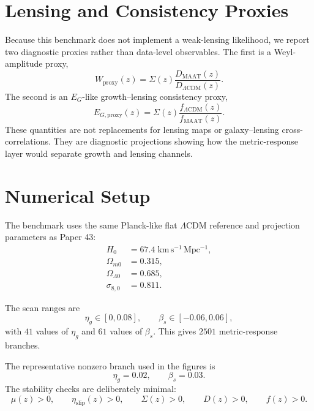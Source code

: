\documentclass[11pt,a4paper]{article}
\newcommand{\LCDM}{\Lambda\mathrm{CDM}}
\newcommand{\etaslip}{\eta_{\mathrm{slip}}}
\begin{document}
\section{Lensing and Consistency Proxies}

Because this benchmark does not implement a weak-lensing likelihood, we report
two diagnostic proxies rather than data-level observables.
The first is a Weyl-amplitude proxy,
\begin{equation}
W_{\mathrm{proxy}}(z)
=
\Sigma(z)\frac{D_{\mathrm{MAAT}}(z)}{D_{\LCDM}(z)}.
\label{eq:weyl_proxy}
\end{equation}
The second is an $E_G$-like growth--lensing consistency proxy,
\begin{equation}
E_{G,\mathrm{proxy}}(z)
=
\Sigma(z)\frac{f_{\LCDM}(z)}{f_{\mathrm{MAAT}}(z)}.
\label{eq:eg_proxy}
\end{equation}
These quantities are not replacements for lensing maps or galaxy--lensing
cross-correlations.
They are diagnostic projections showing how the metric-response layer would
separate growth and lensing channels.

\section{Numerical Setup}

The benchmark uses the same Planck-like flat $\LCDM$ reference and projection
parameters as Paper 43:
\begin{align}
H_0 &= 67.4\;\mathrm{km\,s^{-1}\,Mpc^{-1}},\\
\Omega_{m0} &= 0.315,\\
\Omega_{\Lambda0} &= 0.685,\\
\sigma_{8,0} &= 0.811.
\end{align}

The scan ranges are
\begin{equation}
\eta_g\in[0,0.08],
\qquad
\beta_s\in[-0.06,0.06],
\end{equation}
with $41$ values of $\eta_g$ and $61$ values of $\beta_s$.
This gives $2501$ metric-response branches.

The representative nonzero branch used in the figures is
\begin{equation}
\eta_g=0.02,
\qquad
\beta_s=0.03.
\end{equation}
The stability checks are deliberately minimal:
\begin{equation}
\mu(z)>0,
\qquad
\etaslip(z)>0,
\qquad
\Sigma(z)>0,
\qquad
D(z)>0,
\qquad
f(z)>0.
\end{equation}
\end{document}
